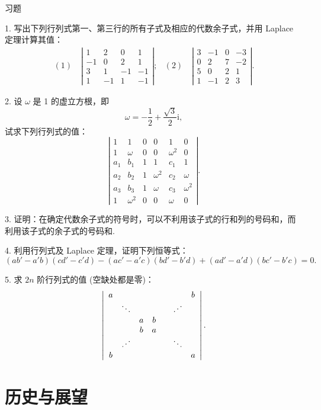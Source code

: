 \documentclass[UTF8, 12pt, fontset=fandol, oneside]{ctexart}
\begin{document}
\begin{center}
习\quad 题
\end{center}

1. 写出下列行列式第一、第三行的所有子式及相应的代数余子式，并用 Laplace 定理计算其值：
\[
\begin{array}{ll}
(1)\quad
\left|\begin{array}{rrrr}
1&2&0&1\\
-1&0&2&1\\
3&1&-1&-1\\
1&-1&1&-1
\end{array}\right|;
&
(2)\quad
\left|\begin{array}{rrrr}
3&-1&0&-3\\
0&2&7&-2\\
5&0&2&1\\
1&-1&2&3
\end{array}\right|.
\end{array}
\]

2. 设 $\omega$ 是 1 的虚立方根，即
\[
\omega=-\frac{1}{2}+\frac{\sqrt{3}}{2}\mathrm{i},
\]
试求下列行列式的值：
\[
\left|\begin{array}{cccccc}
1&1&0&0&1&0\\
1&\omega&0&0&\omega^2&0\\
a_1&b_1&1&1&c_1&1\\
a_2&b_2&1&\omega^2&c_2&\omega\\
a_3&b_3&1&\omega&c_3&\omega^2\\
1&\omega^2&0&0&\omega&0
\end{array}\right|.
\]

3. 证明：在确定代数余子式的符号时，可以不利用该子式的行和列的号码和，而利用该子式的余子式的号码和.

4. 利用行列式及 Laplace 定理，证明下列恒等式：
\[
(ab'-a'b)(cd'-c'd)-(ac'-a'c)(bd'-b'd)+(ad'-a'd)(bc'-b'c)=0.
\]

5. 求 $2n$ 阶行列式的值 (空缺处都是零)：
\[
\left|\begin{array}{ccccccc}
a&&&&&&b\\
&\ddots&&&&\reflectbox{$\ddots$}&\\
&&a&b&&&\\
&&b&a&&&\\
&\reflectbox{$\ddots$}&&&&\ddots&\\
b&&&&&&a
\end{array}\right|.
\]

\section*{历史与展望}
\end{document}
